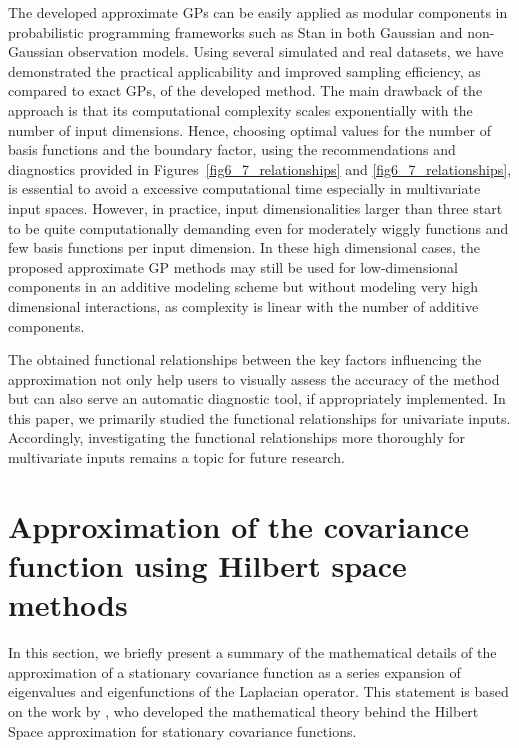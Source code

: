 The developed approximate GPs can be easily applied as modular components in probabilistic programming frameworks such as Stan in both Gaussian and non-Gaussian observation models. Using several simulated and real datasets, we have demonstrated the practical applicability and improved sampling efficiency, as compared to exact GPs, of the developed method. The main drawback of the approach is that its computational complexity scales exponentially with the number of input dimensions. Hence, choosing optimal values for the number of basis functions and the boundary factor, using the recommendations and diagnostics provided in Figures~\ref{fig6_7_relationships} and \ref{fig6_7_relationships}, is essential to avoid a excessive computational time especially in multivariate input spaces. However, in practice, input dimensionalities larger than three start to be quite computationally demanding even for moderately wiggly functions and few basis functions per input dimension. In these high dimensional cases, the proposed approximate GP methods may still be used for low-dimensional components in an additive modeling scheme but without modeling very high dimensional interactions, as complexity is linear with the number of additive components.

The obtained functional relationships between the key factors influencing the approximation not only help users to visually assess the accuracy of the method
but can also serve an automatic diagnostic tool, if appropriately implemented.
In this paper, we primarily studied the functional relationships for univariate inputs. Accordingly, investigating the functional relationships more thoroughly for multivariate inputs remains a topic for future research. 


\appendix


\section{Approximation of the covariance function using Hilbert space methods} \label{app_approx_covfun}

In this section, we briefly present a summary of the mathematical details of the approximation of a stationary covariance function as a series expansion of eigenvalues and eigenfunctions of the Laplacian operator. This statement is based on the work by \citet{solin2018hilbert}, who developed the mathematical theory behind the Hilbert Space approximation for stationary covariance functions.

